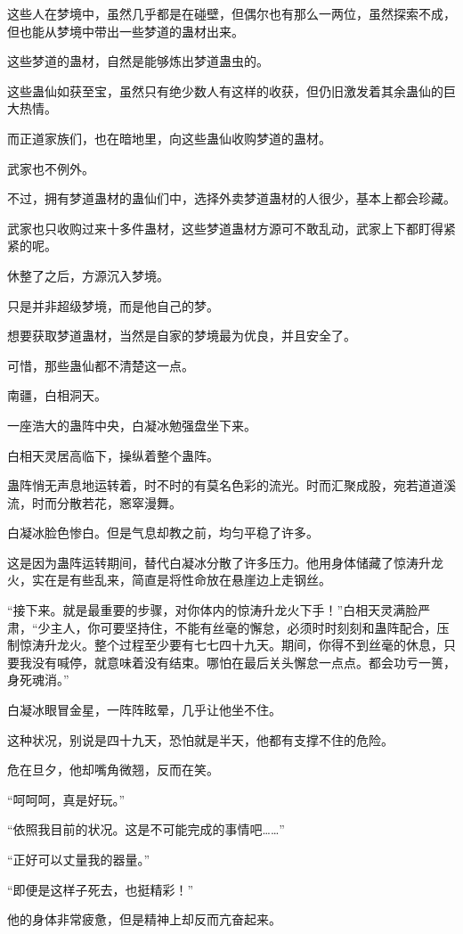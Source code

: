 \begin{this_body}
这些人在梦境中，虽然几乎都是在碰壁，但偶尔也有那么一两位，虽然探索不成，但也能从梦境中带出一些梦道的蛊材出来。

这些梦道的蛊材，自然是能够炼出梦道蛊虫的。

这些蛊仙如获至宝，虽然只有绝少数人有这样的收获，但仍旧激发着其余蛊仙的巨大热情。

而正道家族们，也在暗地里，向这些蛊仙收购梦道的蛊材。

武家也不例外。

不过，拥有梦道蛊材的蛊仙们中，选择外卖梦道蛊材的人很少，基本上都会珍藏。

武家也只收购过来十多件蛊材，这些梦道蛊材方源可不敢乱动，武家上下都盯得紧紧的呢。

休整了之后，方源沉入梦境。

只是并非超级梦境，而是他自己的梦。

想要获取梦道蛊材，当然是自家的梦境最为优良，并且安全了。

可惜，那些蛊仙都不清楚这一点。

南疆，白相洞天。

一座浩大的蛊阵中央，白凝冰勉强盘坐下来。

白相天灵居高临下，操纵着整个蛊阵。

蛊阵悄无声息地运转着，时不时的有莫名色彩的流光。时而汇聚成股，宛若道道溪流，时而分散若花，窸窣漫舞。

白凝冰脸色惨白。但是气息却教之前，均匀平稳了许多。

这是因为蛊阵运转期间，替代白凝冰分散了许多压力。他用身体储藏了惊涛升龙火，实在是有些乱来，简直是将性命放在悬崖边上走钢丝。

“接下来。就是最重要的步骤，对你体内的惊涛升龙火下手！”白相天灵满脸严肃，“少主人，你可要坚持住，不能有丝毫的懈怠，必须时时刻刻和蛊阵配合，压制惊涛升龙火。整个过程至少要有七七四十九天。期间，你得不到丝毫的休息，只要我没有喊停，就意味着没有结束。哪怕在最后关头懈怠一点点。都会功亏一篑，身死魂消。”

白凝冰眼冒金星，一阵阵眩晕，几乎让他坐不住。

这种状况，别说是四十九天，恐怕就是半天，他都有支撑不住的危险。

危在旦夕，他却嘴角微翘，反而在笑。

“呵呵呵，真是好玩。”

“依照我目前的状况。这是不可能完成的事情吧……”

“正好可以丈量我的器量。”

“即便是这样子死去，也挺精彩！”

他的身体非常疲惫，但是精神上却反而亢奋起来。


\end{this_body}
